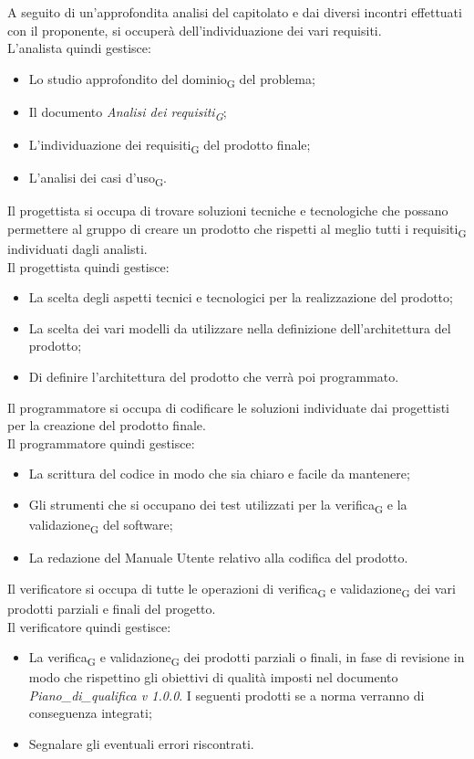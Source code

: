 	A seguito di un'approfondita analisi del capitolato e dai diversi incontri effettuati con il proponente, si occuperà dell'individuazione dei vari requisiti. \\ 
	L'analista quindi gestisce:
	\begin{itemize}
		\item Lo studio approfondito del dominio\textsubscript{G} del problema;
		\item Il documento \textit{Analisi dei requisiti\textsubscript{G}};
		\item L'individuazione dei requisiti\textsubscript{G} del prodotto finale;
		\item L'analisi dei casi d'uso\textsubscript{G}.
	\end{itemize}
	Il progettista si occupa di trovare soluzioni tecniche e tecnologiche che possano permettere al gruppo di creare un prodotto che rispetti al meglio tutti i requisiti\textsubscript{G} individuati dagli analisti. \\
	Il progettista quindi gestisce:
	\begin{itemize}
		\item La scelta degli aspetti tecnici e tecnologici per la realizzazione del prodotto;
		\item La scelta dei vari modelli da utilizzare nella definizione dell'architettura del prodotto;
		\item Di definire l'architettura del prodotto che verrà poi programmato.
	\end{itemize}
	Il programmatore si occupa di codificare le soluzioni individuate dai progettisti per la creazione del prodotto finale. \\
	Il programmatore quindi gestisce:
	\begin{itemize}
		\item La scrittura del codice in modo che sia chiaro e facile da mantenere;
		\item Gli strumenti che si occupano dei test utilizzati per la verifica\textsubscript{G} e la validazione\textsubscript{G} del software;
		\item La redazione del Manuale Utente relativo alla codifica del prodotto.
	\end{itemize}
	Il verificatore si occupa di tutte le operazioni di verifica\textsubscript{G} e validazione\textsubscript{G} dei vari prodotti parziali e finali del progetto. \\
	Il verificatore quindi gestisce:
	\begin{itemize}
		\item La verifica\textsubscript{G} e validazione\textsubscript{G} dei prodotti parziali o finali, in fase di revisione in modo che rispettino gli obiettivi di qualità imposti nel documento \textit{Piano\_di\_qualifica v 1.0.0}. I seguenti prodotti se a norma verranno di conseguenza integrati;
		\item Segnalare gli eventuali errori riscontrati.
	\end{itemize}
